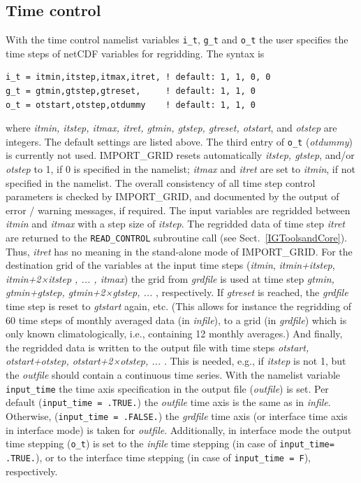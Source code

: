 \documentclass[11pt,twoside]{report}
\begin{document}
\subsection{Time control}
With the time control namelist variables \verb|i_t|,  \verb|g_t| and  \verb|o_t| the user
 specifies the time steps of netCDF variables for regridding. The syntax is
\begin{verbatim}
i_t = itmin,itstep,itmax,itret, ! default: 1, 1, 0, 0
g_t = gtmin,gtstep,gtreset,     ! default: 1, 1, 0
o_t = otstart,otstep,otdummy    ! default: 1, 1, 0
\end{verbatim}
where {\it itmin, itstep, itmax, itret, gtmin, gtstep, gtreset, otstart}, and 
{\it otstep} are integers.
The default settings are listed above. The third entry of \verb|o_t| 
({\it otdummy}) is currently not used.
IMPORT\_GRID resets automatically {\it itstep, gtstep}, and/or {\it otstep} to 1, if 0 is
specified in the namelist; {\it itmax} and {\it itret} are set to {\it itmin}, 
if not specified in the namelist. The overall consistency of all time step control parameters 
is checked by IMPORT\_GRID, and documented by the output of error / warning
 messages, if required.
The input variables are regridded between {\it itmin} and {\it itmax} with a step size of
{\it itstep}. The regridded data of time step {\it itret} are returned to the \verb|READ_CONTROL|
subroutine call (see Sect.~\ref{IGToolsandCore}). Thus, {\it itret} has no meaning in the
 stand-alone mode of IMPORT\_GRID.
For the destination grid of the variables at the input time steps ({\it itmin}, {\it itmin+itstep}, {\it itmin+2×itstep , ... , itmax}) the grid from {\it grdfile} is used at time step
{\it gtmin, gtmin+gtstep, gtmin+2×gtstep, ...} , respectively. If {\it gtreset} is reached, the
{\it grdfile} time step is reset to {\it gtstart} again, etc. 
(This allows for instance the regridding
of 60 time steps of monthly averaged data (in {\it infile}), to a grid (in {\it grdfile}) which is
only known climatologically, i.e., containing 12 monthly averages.)
And finally, the regridded data is written to the output file with time steps
{\it otstart, otstart+otstep, otstart+2×otstep, ... }. This is needed, e.g., if {\it itstep}
 is not 1, but the {\it outfile} should contain a continuous time series.
With the namelist variable \verb|input_time| the time axis specification in the output
file ({\it outfile}) is set. Per default (\verb|input_time = .TRUE.|) the {\it outfile} time axis is the same as
in {\it infile}. Otherwise, (\verb|input_time = .FALSE.|) the {\it grdfile} time axis 
(or interface time axis in interface mode) is taken for {\it outfile}.
 Additionally, in interface mode the output time stepping (\verb|o_t|) is set to the {\it infile}
 time stepping (in case of \verb|input_time= .TRUE.|), or
to the interface time stepping (in case of \verb|input_time = F|), respectively.
\end{document}
